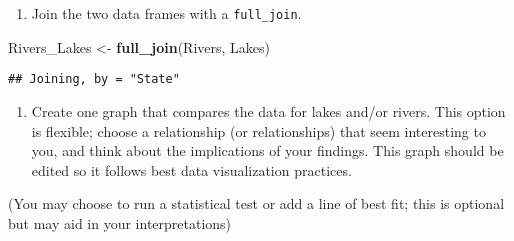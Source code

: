\documentclass[]{article}
\newenvironment{Shaded}{\begin{snugshade}}{\end{snugshade}}
\newcommand{\CommentTok}[1]{\textcolor[rgb]{0.56,0.35,0.01}{\textit{#1}}}
\newcommand{\DataTypeTok}[1]{\textcolor[rgb]{0.13,0.29,0.53}{#1}}
\newcommand{\DecValTok}[1]{\textcolor[rgb]{0.00,0.00,0.81}{#1}}
\newcommand{\KeywordTok}[1]{\textcolor[rgb]{0.13,0.29,0.53}{\textbf{#1}}}
\newcommand{\NormalTok}[1]{#1}
\newcommand{\OperatorTok}[1]{\textcolor[rgb]{0.81,0.36,0.00}{\textbf{#1}}}
\newcommand{\StringTok}[1]{\textcolor[rgb]{0.31,0.60,0.02}{#1}}
\providecommand{\tightlist}{%
  \setlength{\itemsep}{0pt}\setlength{\parskip}{0pt}}
\begin{document}
\begin{enumerate}
\def\labelenumi{\arabic{enumi}.}
\setcounter{enumi}{9}
\tightlist
\item
  Join the two data frames with a \texttt{full\_join}.
\end{enumerate}

\begin{Shaded}
\begin{Highlighting}[]
\NormalTok{Rivers_Lakes <-}\StringTok{ }\KeywordTok{full_join}\NormalTok{(Rivers, Lakes)}
\end{Highlighting}
\end{Shaded}

\begin{verbatim}
## Joining, by = "State"
\end{verbatim}

\begin{enumerate}
\def\labelenumi{\arabic{enumi}.}
\setcounter{enumi}{10}
\tightlist
\item
  Create one graph that compares the data for lakes and/or rivers. This
  option is flexible; choose a relationship (or relationships) that seem
  interesting to you, and think about the implications of your findings.
  This graph should be edited so it follows best data visualization
  practices.
\end{enumerate}

(You may choose to run a statistical test or add a line of best fit;
this is optional but may aid in your interpretations)

\begin{Shaded}
\end{Shaded}
\end{document}
